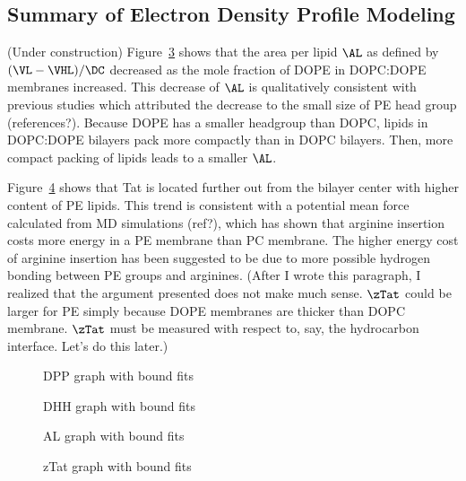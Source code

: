 \subsection{Summary of Electron Density Profile Modeling}
(Under construction)
Figure~\ref{fig:SDP_AL} shows that the area per lipid $\AL$ 
as defined by $(\VL-\VHL)/\DC$ decreased as the mole
fraction of DOPE in DOPC:DOPE membranes increased. 
This decrease of $\AL$ is qualitatively consistent with 
previous studies which attributed the decrease to the small size of PE
head group (references?). 
Because DOPE has a smaller headgroup than DOPC, lipids in DOPC:DOPE
bilayers pack more compactly than in DOPC bilayers. Then, more compact packing of
lipids leads to a smaller $\AL$.  

Figure~\ref{fig:SDP_zTat} shows that Tat is located further out from the bilayer 
center with higher content of PE lipids. This trend is consistent with 
a potential mean force calculated from MD simulations (ref?), 
which has shown that arginine insertion costs more energy in 
a PE membrane than PC membrane. The higher energy cost of arginine insertion 
has been suggested to be due to more possible hydrogen bonding between PE groups and arginines.
(After I wrote this paragraph, I realized that the argument presented does
not make much sense. $\zTat$ could be larger for PE simply because DOPE
membranes are thicker than DOPC membrane. $\zTat$ must be measured with 
respect to, say, the hydrocarbon interface. Let's do this later.)

\begin{figure}
  \centering
  \caption{DPP graph with bound fits}
  \label{fig:SDP_DPP}
\end{figure}

\begin{figure}
  \centering
  \caption{DHH graph with bound fits}
  \label{fig:SDP_DHH}
\end{figure}

\begin{figure}
  \centering
  \caption{AL graph with bound fits}
  \label{fig:SDP_AL}
\end{figure}

\begin{figure}
  \centering
  \caption{zTat graph with bound fits}
  \label{fig:SDP_zTat}
\end{figure}

